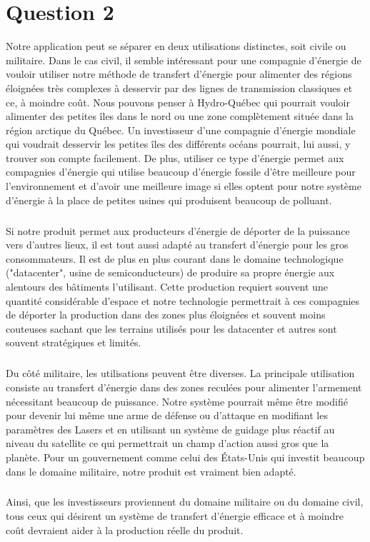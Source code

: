 \chapter*{Question 2}
Notre application peut se séparer en deux utilisations distinctes, soit civile ou militaire. Dans le cas civil, il semble intéressant pour une compagnie d'énergie de vouloir utiliser notre méthode de transfert d'énergie pour alimenter des régions éloignées très complexes à desservir par des lignes de transmission classiques et ce, à moindre coût. Nous pouvons penser à Hydro-Québec qui pourrait vouloir alimenter des petites îles dans le nord ou une zone complètement située dans la région arctique du Québec. Un investisseur d'une compagnie d'énergie mondiale qui voudrait desservir les petites îles des différents océans pourrait, lui aussi, y trouver son compte facilement. De plus, utiliser ce type d'énergie permet aux compagnies d'énergie qui utilise beaucoup d'énergie fossile d'être meilleure pour l'environnement et d'avoir une meilleure image si elles optent pour notre système d'énergie à la place de petites usines qui produisent beaucoup de polluant. 

\paragraph{} Si notre produit permet aux producteurs d'énergie de déporter de la puissance vers d'autres lieux, il est tout aussi adapté au transfert d'énergie pour les gros consommateurs. Il est de plus en plus courant dans le domaine technologique ("datacenter", usine de semiconducteurs) de produire sa propre énergie aux alentours des bâtiments l'utilisant. Cette production requiert souvent une quantité considérable d'espace et notre technologie permettrait à ces compagnies de déporter la production dans des zones plus éloignées et souvent moins couteuses sachant que les terrains utilisés pour les datacenter et autres sont souvent stratégiques et limités.

\paragraph{} Du côté militaire, les utilisations peuvent être diverses. La principale utilisation consiste au transfert d'énergie dans des zones reculées pour alimenter l'armement nécessitant beaucoup de puissance. Notre système pourrait même être modifié pour devenir lui même une arme de défense ou d'attaque en modifiant les paramètres des Lasers et en utilisant un système de guidage plus réactif au niveau du satellite ce qui permettrait un champ d'action aussi gros que la planète. Pour un gouvernement comme celui des États-Unis qui investit beaucoup dans le domaine militaire, notre produit est vraiment bien adapté. 

\paragraph{} Ainsi, que les investisseurs proviennent du domaine militaire ou du domaine civil, tous ceux qui désirent un système de transfert d'énergie efficace et à moindre coût devraient aider à la production réelle du produit.
